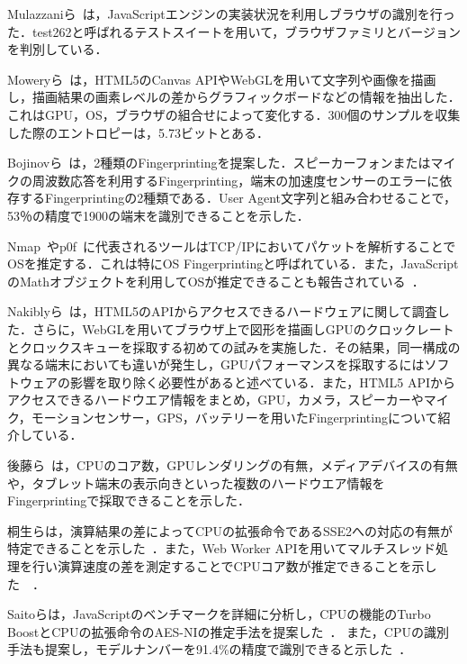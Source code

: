Mulazzaniら~\cite{mulazzani2013fast}は，JavaScriptエンジンの実装状況を利用しブラウザの識別を行った．test262と呼ばれるテストスイートを用いて，ブラウザファミリとバージョンを判別している．

Moweryら~\cite{mowery2012pixel}は，HTML5のCanvas APIやWebGLを用いて文字列や画像を描画し，描画結果の画素レベルの差からグラフィックボードなどの情報を抽出した．これはGPU，OS，ブラウザの組合せによって変化する．300個のサンプルを収集した際のエントロピーは，5.73ビットとある．

Bojinovら~\cite{bojinov2014mobile}は，2種類のFingerprintingを提案した．スピーカーフォンまたはマイクの周波数応答を利用するFingerprinting，端末の加速度センサーのエラーに依存するFingerprintingの2種類である．User Agent文字列と組み合わせることで，53％の精度で1900の端末を識別できることを示した．

Nmap~\cite{nmap}やp0f~\cite{p0f}に代表されるツールはTCP/IPにおいてパケットを解析することでOSを推定する．これは特にOS Fingerprintingと呼ばれている．また，JavaScriptのMathオブジェクトを利用してOSが推定できることも報告されている~\cite{tor_bugtrack}．

Nakiblyら~\cite{nakibly2015hardware}は，HTML5のAPIからアクセスできるハードウェアに関して調査した．さらに，WebGLを用いてブラウザ上で図形を描画しGPUのクロックレートとクロックスキューを採取する初めての試みを実施した．その結果，同一構成の異なる端末においても違いが発生し，GPUパフォーマンスを採取するにはソフトウェアの影響を取り除く必要性があると述べている．また，HTML5 APIからアクセスできるハードウエア情報をまとめ，GPU，カメラ，スピーカーやマイク，モーションセンサー，GPS，バッテリーを用いたFingerprintingについて紹介している．

後藤ら~\cite{後藤浩行2013web}は，CPUのコア数，GPUレンダリングの有無，メディアデバイスの有無や，タブレット端末の表示向きといった複数のハードウエア情報をFingerprintingで採取できることを示した．

桐生らは，演算結果の差によってCPUの拡張命令であるSSE2への対応の有無が特定できることを示した~\cite{桐生直輝2013cpu}．また，Web Worker APIを用いてマルチスレッド処理を行い演算速度の差を測定することでCPUコア数が推定できることを示した~~\cite{桐生直輝2014web}．

Saitoらは，JavaScriptのベンチマークを詳細に分析し，CPUの機能のTurbo BoostとCPUの拡張命令のAES-NIの推定手法を提案した~\cite{saito2016estimating}．
また，CPUの識別手法も提案し，モデルナンバーを91.4\%の精度で識別できると示した~\cite{saito2017web}．
